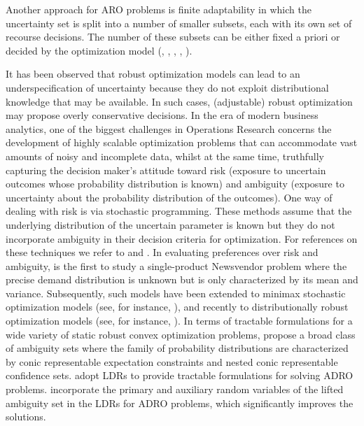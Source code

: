 \documentclass[fleqn,isre,blindrev]{informs4}
\begin{document}
	Another approach for ARO problems is finite adaptability in which the uncertainty set is split into a number of smaller subsets, each with its own set of recourse decisions. The number of these subsets can be either fixed a priori or decided by the optimization model (\cite{vkr11}, \cite{bc10}, \cite{hkw14}, \cite{pd16}, \cite{bd16a}).
	
	It has been observed that robust optimization models can lead to an underspecification of uncertainty because they do not exploit distributional knowledge that may be available. In such cases, (adjustable) robust optimization may propose overly conservative decisions. In the era of modern business analytics, one of the biggest challenges in Operations Research concerns the development of highly scalable optimization problems that can accommodate vast amounts of noisy and incomplete data, whilst at the same time, truthfully capturing the decision maker's attitude toward risk (exposure to uncertain outcomes whose probability distribution is known) and ambiguity (exposure to uncertainty about the probability distribution of the outcomes). One way of dealing with risk is via stochastic programming. These methods assume that the underlying distribution of the uncertain parameter is known but they do not incorporate ambiguity in their decision criteria for optimization. For references on these techniques we refer to \cite{bl97} and \cite{kw95}. In evaluating preferences over risk and ambiguity, \cite{scarf58} is the first to study a single-product Newsvendor problem where the precise demand distribution is unknown but is only characterized by its mean and variance. Subsequently, such models have been extended to minimax stochastic optimization models (see, for instance, \cite{z66,be95,sk02,sa04}), and recently to distributionally robust optimization models (see, for instance, \cite{css07,cs09,p07,dy10,xm12}). In terms of tractable formulations for a wide variety of static robust convex optimization problems, \cite{wks14} propose a broad class of ambiguity  {sets} where the family of probability distributions are characterized by conic representable expectation constraints and nested conic representable confidence sets. \cite{css07} adopt LDRs to provide tractable formulations for solving ADRO problems. \cite{bsz17} incorporate the primary and auxiliary random variables of the lifted ambiguity set in the LDRs for ADRO problems, which significantly improves the solutions.
	
\end{document}
